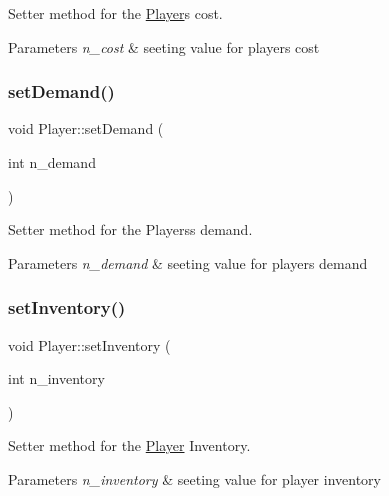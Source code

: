 Setter method for the \hyperlink{class_player}{Player}\textquotesingle{}s cost. 


\begin{DoxyParams}{Parameters}
{\em n\+\_\+cost} & seeting value for player\textquotesingle{}s cost \\
\hline
\end{DoxyParams}
\mbox{\label{class_player_aba795131e99318dfc9d4fef7de189aac}} 
\subsubsection{\texorpdfstring{set\+Demand()}{setDemand()}}
{\footnotesize\ttfamily void Player\+::set\+Demand (\begin{DoxyParamCaption}\item[{int}]{n\+\_\+demand }\end{DoxyParamCaption})}



Setter method for the Players\textquotesingle{}s demand. 


\begin{DoxyParams}{Parameters}
{\em n\+\_\+demand} & seeting value for player\textquotesingle{}s demand \\
\hline
\end{DoxyParams}
\mbox{\label{class_player_a279e316b279fcf5e78f395bea0f417f0}} 
\subsubsection{\texorpdfstring{set\+Inventory()}{setInventory()}}
{\footnotesize\ttfamily void Player\+::set\+Inventory (\begin{DoxyParamCaption}\item[{int}]{n\+\_\+inventory }\end{DoxyParamCaption})}



Setter method for the \hyperlink{class_player}{Player} Inventory. 


\begin{DoxyParams}{Parameters}
{\em n\+\_\+inventory} & seeting value for player inventory \\
\hline
\end{DoxyParams}
\mbox{\label{class_player_ab197bac4da8cbf646c6ffa36a16ad0b0}} 
